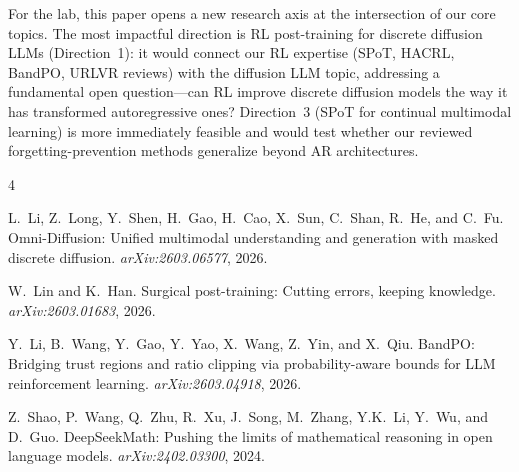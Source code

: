 \documentclass[11pt]{article}
\begin{document}
For the lab, this paper opens a new research axis at the intersection of our core topics. The most impactful direction is RL post-training for discrete diffusion LLMs (Direction~1): it would connect our RL expertise (SPoT, HACRL, BandPO, URLVR reviews) with the diffusion LLM topic, addressing a fundamental open question---can RL improve discrete diffusion models the way it has transformed autoregressive ones? Direction~3 (SPoT for continual multimodal learning) is more immediately feasible and would test whether our reviewed forgetting-prevention methods generalize beyond AR architectures.


\begin{thebibliography}{4}

L.~Li, Z.~Long, Y.~Shen, H.~Gao, H.~Cao, X.~Sun, C.~Shan, R.~He, and C.~Fu.
\newblock Omni-Diffusion: Unified multimodal understanding and generation with masked discrete diffusion.
\newblock \emph{arXiv:2603.06577}, 2026.

W.~Lin and K.~Han.
\newblock Surgical post-training: Cutting errors, keeping knowledge.
\newblock \emph{arXiv:2603.01683}, 2026.

Y.~Li, B.~Wang, Y.~Gao, Y.~Yao, X.~Wang, Z.~Yin, and X.~Qiu.
\newblock BandPO: Bridging trust regions and ratio clipping via probability-aware bounds for LLM reinforcement learning.
\newblock \emph{arXiv:2603.04918}, 2026.

Z.~Shao, P.~Wang, Q.~Zhu, R.~Xu, J.~Song, M.~Zhang, Y.K.~Li, Y.~Wu, and D.~Guo.
\newblock DeepSeekMath: Pushing the limits of mathematical reasoning in open language models.
\newblock \emph{arXiv:2402.03300}, 2024.

\end{thebibliography}
\end{document}
